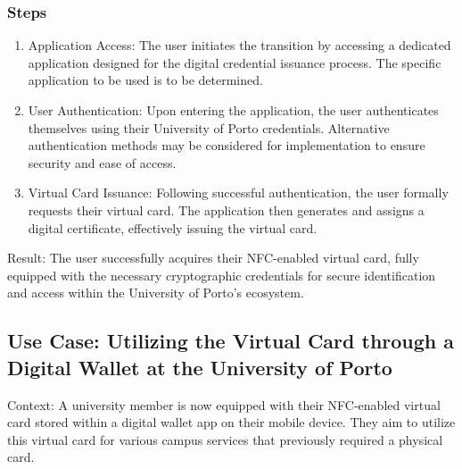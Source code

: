 \documentclass[10pt]{article}
\begin{document}
\subsubsection{Steps}
\begin{enumerate}
  \item Application Access: The user initiates the transition by accessing a dedicated application designed for the digital credential issuance process. The specific application to be used is to be determined.
  
  \item User Authentication: Upon entering the application, the user authenticates themselves using their University of Porto credentials. Alternative authentication methods may be considered for implementation to ensure security and ease of access.
  
  \item Virtual Card Issuance: Following successful authentication, the user formally requests their virtual card. The application then generates and assigns a digital certificate, effectively issuing the virtual card.
\end{enumerate}

Result: The user successfully acquires their NFC-enabled virtual card, fully equipped with the necessary cryptographic credentials for secure identification and access within the University of Porto's ecosystem.

\subsection{Use Case: Utilizing the Virtual Card through a Digital Wallet at the University of Porto}
Context: A university member is now equipped with their NFC-enabled virtual card stored within a digital wallet app on their mobile device. They aim to utilize this virtual card for various campus services that previously required a physical card.
\end{document}
